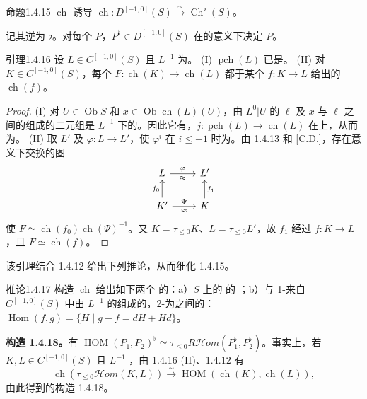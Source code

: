 \begin{SGAresult}{命题}{1.4.15}
 $\operatorname{ch}$ 诱导 $\operatorname{ch}:D^{[-1,0]}(S)\xrightarrow\sim\operatorname{Ch}^{\flat}(S)$。
\end{SGAresult}
记其逆为 $\flat$。对每个  $P$，$P^\flat\in D^{[-1,0]}(S)$ 在的意义下决定 $P$。
\begin{SGAresult}{引理}{1.4.16}
设 $L\in C^{[-1,0]}(S)$ 且 $L^{-1}$ 为。
(I) $\operatorname{pch}(L)$ 已是。
(II) 对 $K\in C^{[-1,0]}(S)$，每个 $F:\operatorname{ch}(K)\to\operatorname{ch}(L)$ 都于某个 $f:K\to L$ 给出的 $\operatorname{ch}(f)$。
\end{SGAresult}
\begin{proof}
(I) 对 $U\in\operatorname{Ob}S$ 和 $x\in\operatorname{Ob}\operatorname{ch}(L)(U)$，由 $L^0|U$ 的 $\ell$ 及 $x$ 与 $\ell$ 之间的组成的二元组是 $L^{-1}$ 下的。因此它有，$j:\operatorname{pch}(L)\to\operatorname{ch}(L)$ 在上，从而为。
(II) 取 $L'$ 及 $\varphi:L\to L'$，使 $\varphi^i$ 在 $i\le-1$ 时为。由 1.4.13 和 [C.D.]，存在意义下交换的图
\[\begin{tikzcd}L\arrow[r,"\varphi","\approx"']&L'\\K'\arrow[u,"f_0"]\arrow[r,"\Psi","\approx"']&K\arrow[u,"f_1"']\end{tikzcd}\]
使 $F\simeq\operatorname{ch}(f_0)\operatorname{ch}(\Psi)^{-1}$。又 $K=\tau_{\le0}K$、$L=\tau_{\le0}L'$，故 $f_1$ 经过 $f:K\to L$，且 $F\simeq\operatorname{ch}(f)$。
\end{proof}
该引理结合 1.4.12 给出下列推论，从而细化 1.4.15。
\begin{SGAresult}{推论}{1.4.17}
构造 $\operatorname{ch}$ 给出如下两个 的：a）$S$ 上的 的 ；b）与 1-来自 $C^{[-1,0]}(S)$ 中由 $L^{-1}$ 的组成的，2-为之间的：$\operatorname{Hom}(f,g)=\{H\mid g-f=dH+Hd\}$。
\end{SGAresult}
\textbf{构造 1.4.18。}有 $\operatorname{HOM}(P_1,P_2)^\flat\simeq\tau_{\le0}R\mathcal Hom(P_1^\flat,P_2^\flat)$。事实上，若 $K,L\in C^{[-1,0]}(S)$ 且 $L^{-1}$ ，由 1.4.16 (II)、1.4.12 有
\[\operatorname{ch}(\tau_{\le0}\mathcal Hom(K,L))\xrightarrow\sim\operatorname{HOM}(\operatorname{ch}(K),\operatorname{ch}(L)),\tag{1.4.18.1}\]
由此得到的构造 1.4.18。

